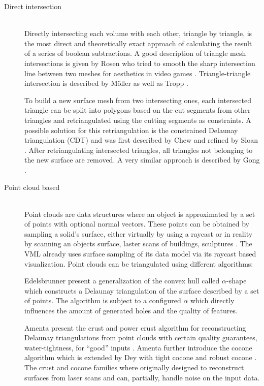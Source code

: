 \begin{description}
	
	\item[Direct intersection] \hfill \\
	Directly intersecting each volume with each other, triangle by triangle, is the most direct and theoretically exact approach of calculating the result of a series of boolean subtractions.
	A good description of triangle mesh intersections is given by Rosen who tried to smooth the sharp intersection line between two meshes for aesthetics in video games \cite{mesh_intersection}.
	Triangle-triangle intersection is described by Möller \cite{tri_tri_intersection_moller} as well as Tropp \etal \cite{tri_tri_intersection_2}.
	
	To build a new surface mesh from two intersecting ones, each intersected triangle can be split into polygons based on the cut segments from other triangles and retriangulated using the cutting segments as constraints.
	A possible solution for this retriangulation is the constrained Delaunay triangulation (CDT) and was first described by Chew \cite{cdt} and refined by Sloan \cite{cdt_fast}.
	After retriangulating intersected triangles, all triangles not belonging to the new surface are removed.
	A very similar approach is described by Gong \cite{cutter_workpiece_engagement}.
	
	
	\item[Point cloud based] \hfill \\
	Point clouds are data structures where an object is approximated by a set of points with optional normal vectors.
	These points can be obtained \eg by sampling a solid's surface, either virtually by \eg using a raycast or in reality by scanning an objects surface, \eg laster scans of buildings, sculptures \etc.
	The VML already uses surface sampling of its data model via its raycast based visualization.
	Point clouds can be triangulated using different algorithms:
	
	Edelsbrunner \etal present a generalization of the convex hull called $\alpha$-shape \cite{alpha_shape} which constructs a Delaunay triangulation of the surface described by a set of points.
	The algorithm is subject to a configured $\alpha$ which directly influences the amount of generated holes and the quality of features.
	
	Amenta \etal present the crust and power crust algorithm for reconstructing Delaunay triangulations from point clouds with certain quality guarantees, \eg water-tightness, for \enquote{good} inputs \cite{crust, power_crust}.
	Amenta \etal further introduce the cocone algorithm \cite{cocone} which is extended by Dey \etal with tight cocone and robust cocone \cite{tight_cocone, robust_cocone}.
	The crust and cocone families where originally designed to reconstruct surfaces from laser scans and can, partially, handle noise on the input data.
	

\end{description}
